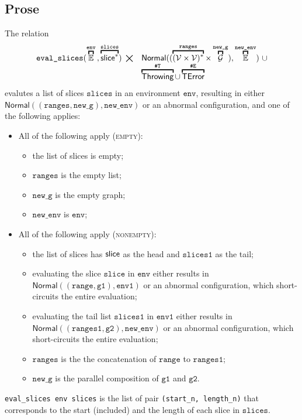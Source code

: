 \documentclass{book}
\newcommand\overname[2]{\overbracket{#1}^{#2}}
\newcommand\XGraphs[0]{\mathcal{G}}
\newcommand\vals[0]{\mathcal{V}}
\newcommand\aslrel[0]{\bigtimes}
\newcommand\aslsep[0]{\mathbf{,}}
\newcommand\ThrowingConfig[0]{\texttt{\#T}}
\newcommand\ErrorConfig[0]{\texttt{\#E}}
\newcommand\ProseOrAbnormal[0]{or an abnormal configuration, which short-circuits the entire evaluation}
\newcommand\TError[0]{\textsf{TError}}
\newcommand\evalslices[1]{\texttt{eval\_slices}(#1)}
\newcommand\Normal[0]{\textsf{Normal}}
\newcommand\Throwing[0]{\textsf{Throwing}}
\newcommand\newenv[0]{\texttt{new\_env}}
\newcommand\env[0]{\texttt{env}}
\newcommand\envone[0]{\texttt{env1}}
\newcommand\newg[0]{\texttt{new\_g}}
\newcommand\vgone[0]{\texttt{g1}}
\newcommand\vgtwo[0]{\texttt{g2}}
\newcommand\vslice[0]{\texttt{slice}}
\newcommand\slices[0]{\texttt{slices}}
\newcommand\slicesone[0]{\texttt{slices1}}
\newcommand\range[0]{\texttt{range}}
\newcommand\ranges[0]{\texttt{ranges}}
\newcommand\rangesone[0]{\texttt{ranges1}}
\begin{document}
\subsection{Prose}
The relation
\[
  \begin{array}{rl}
  \evalslices{\overname{\envs}{\env} \aslsep \overname{\slice^*}{\slices}} \;\aslrel &
    \Normal((\overname{(\vals \times \vals)^*}{\ranges} \times \overname{\XGraphs}{\newg}), \overname{\envs}{\newenv})\ \cup \\
    & \overname{\Throwing}{\ThrowingConfig} \cup \overname{\TError}{\ErrorConfig}
  \end{array}
\]
evalutes a list of slices $\slices$ in an environment $\env$, resulting in either
$\Normal((\ranges, \newg), \newenv)$ or an abnormal configuration,
and one of the following applies:
\begin{itemize}
  \item All of the following apply (\textsc{empty}):
  \begin{itemize}
    \item the list of slices is empty;
    \item $\ranges$ is the empty list;
    \item $\newg$ is the empty graph;
    \item $\newenv$ is $\env$;
  \end{itemize}

  \item All of the following apply (\textsc{nonempty}):
  \begin{itemize}
    \item the list of slices has $\textsf{slice}$ as the head and $\slicesone$ as the tail;
    \item evaluating the slice $\vslice$ in $\env$ either results in \\
    $\Normal((\range, \vgone), \envone)$     \ProseOrAbnormal;
    \item evaluating the tail list $\slicesone$ in $\envone$ either results in \\
    $\Normal((\rangesone, \vgtwo), \newenv)$ \ProseOrAbnormal;
    \item $\ranges$ is the the concatenation of $\range$ to $\rangesone$;
    \item $\newg$ is the parallel composition of $\vgone$ and $\vgtwo$.
  \end{itemize}
\end{itemize}

\texttt{eval\_slices env slices} is the list of pair \texttt{(start\_n, length\_n)} that
corresponds to the start (included) and the length of each slice in
$\slices$.
\end{document}
